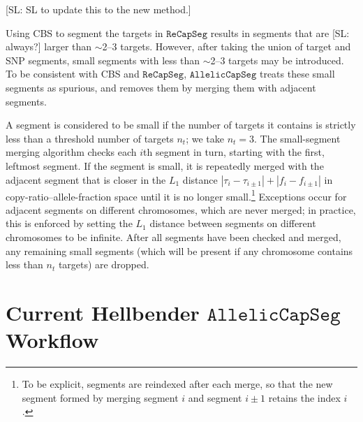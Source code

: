 \documentclass[nofootinbib,amssymb,amsmath]{revtex4}
\newcommand{\RCS}{\texttt{ReCapSeg}}
\newcommand{\ACS}{\texttt{AllelicCapSeg}}
\def\SL#1{{\color [rgb]{0,0,0.8} [SL: #1]}}
\begin{document}
\SL{SL to update this to the new method.}

Using CBS to segment the targets in $\RCS$ results in segments that are \SL{always?} larger than $\sim$2--3 targets.  However, after taking the union of target and SNP segments, small segments with less than $\sim$2--3 targets may be introduced.  To be consistent with CBS and $\RCS$, $\ACS$ treats these small segments as spurious, and removes them by merging them with adjacent segments.

A segment is considered to be small if the number of targets it contains is strictly less than a threshold number of targets $n_t$; we take $n_t = 3$.  The small-segment merging algorithm checks each $i$th segment in turn, starting with the first, leftmost segment.  If the segment is small, it is repeatedly merged with the adjacent segment that is closer in the $L_1$ distance $|\tau_i - \tau_{i \pm 1}| + |f_i - f_{i \pm 1}|$ in copy-ratio--allele-fraction space until it is no longer small.\footnote{To be explicit, segments are reindexed after each merge, so that the new segment formed by merging segment $i$ and segment $i \pm 1$ retains the index $i$.}  Exceptions occur for adjacent segments on different chromosomes, which are never merged; in practice, this is enforced by setting the $L_1$ distance between segments on different chromosomes to be infinite.  After all segments have been checked and merged, any remaining small segments (which will be present if any chromosome contains less than $n_t$ targets) are dropped.

\section{Current Hellbender $\ACS$ Workflow} \label{current-alleliccapseg-workflow}
\end{document}
